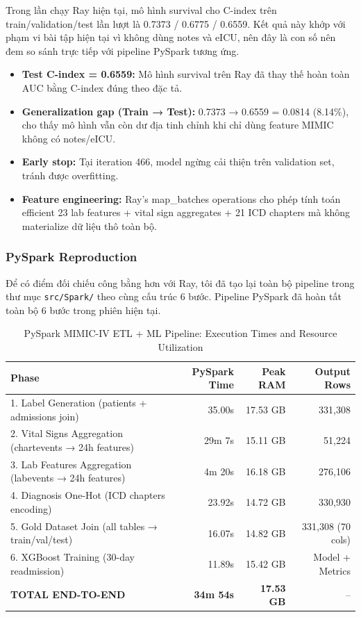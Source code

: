 Trong lần chạy Ray hiện tại, mô hình survival cho C-index trên train/validation/test lần lượt là 0.7373 / 0.6775 / 0.6559. Kết quả này khớp với phạm vi bài tập hiện tại vì không dùng notes và eICU, nên đây là con số nên đem so sánh trực tiếp với pipeline PySpark tương ứng.

\begin{itemize}
    \item \textbf{Test C-index = 0.6559:} Mô hình survival trên Ray đã thay thế hoàn toàn AUC bằng C-index đúng theo đặc tả.
    \item \textbf{Generalization gap (Train → Test):} 0.7373 → 0.6559 = 0.0814 (8.14\%), cho thấy mô hình vẫn còn dư địa tinh chỉnh khi chỉ dùng feature MIMIC không có notes/eICU.
    \item \textbf{Early stop:} Tại iteration 466, model ngừng cải thiện trên validation set, tránh được overfitting.
    \item \textbf{Feature engineering:} Ray's map\_batches operations cho phép tính toán efficient 23 lab features + vital sign aggregates + 21 ICD chapters mà không materialize dữ liệu thô toàn bộ.
\end{itemize}

\subsubsection{PySpark Reproduction}

Để có điểm đối chiếu công bằng hơn với Ray, tôi đã tạo lại toàn bộ pipeline trong thư mục \texttt{src/Spark/} theo cùng cấu trúc 6 bước. Pipeline PySpark đã hoàn tất toàn bộ 6 bước trong phiên hiện tại.

\begin{table}[h!]
\centering
\small
\begin{tabular}{|l|r|r|r|}
\hline
\textbf{Phase} & \textbf{PySpark Time} & \textbf{Peak RAM} & \textbf{Output Rows} \\
\hline
1. Label Generation (patients + admissions join) & 35.00s & 17.53 GB & 331,308 \\
2. Vital Signs Aggregation (chartevents → 24h features) & 29m 7s & 15.11 GB & 51,224 \\
3. Lab Features Aggregation (labevents → 24h features) & 4m 20s & 16.18 GB & 276,106 \\
4. Diagnosis One-Hot (ICD chapters encoding) & 23.92s & 14.72 GB & 330,930 \\
5. Gold Dataset Join (all tables → train/val/test) & 16.07s & 14.82 GB & 331,308 (70 cols) \\
6. XGBoost Training (30-day readmission) & 11.89s & 15.42 GB & Model + Metrics \\
\hline
\textbf{TOTAL END-TO-END} & \textbf{34m 54s} & \textbf{17.53 GB} & -- \\
\hline
\end{tabular}
\caption{PySpark MIMIC-IV ETL + ML Pipeline: Execution Times and Resource Utilization}
\label{table:spark_execution}
\end{table}

